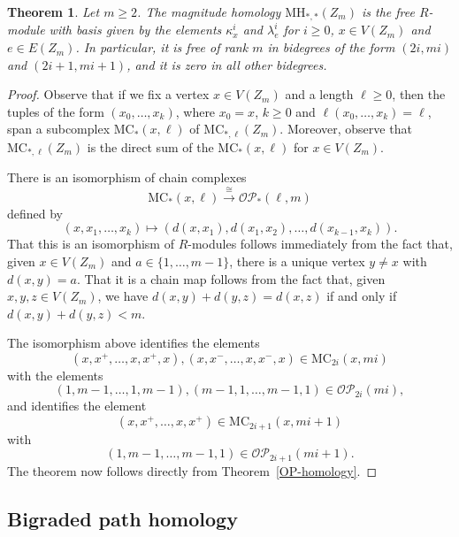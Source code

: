 \documentclass[a4paper, 11 pt, oneside, reqno]{amsart}
\numberwithin{lemma}{section}
\newtheorem{theorem}[lemma]{Theorem}
\theoremstyle{definition}
\newcommand{\OP}{\mathcal{OP}}
\newcommand{\MC}{\mathrm{MC}}
\newcommand{\MH}{\mathrm{MH}}
\begin{document}
\begin{theorem}\label{directed-cycle-MH}
    Let $m\geq 2$.
    The magnitude homology $\MH_{\ast,\ast}(Z_m)$
    is the free $R$-module with basis given by the 
    elements $\kappa_x^i$ and $\lambda_e^i$
    for $i\geq 0$, $x\in V(Z_m)$ and $e\in E(Z_m)$.
    In particular, it is free of rank
    $m$ in bidegrees of the form 
    $(2i,mi)$ and $(2i+1,mi+1)$, and it is zero
    in all other bidegrees.
\end{theorem}

\begin{proof}
    Observe that if we fix a vertex $x\in V(Z_m)$
    and a length $\ell\geq 0$,
    then the tuples of the form
    $(x_0,\ldots,x_k)$,
    where $x_0=x$, $k\geq 0$
    and $\ell(x_0,\ldots,x_k)=\ell$,
    span a subcomplex $\MC_\ast(x,\ell)$
    of $\MC_{\ast,\ell}(Z_m)$.
    Moreover, observe that 
    $\MC_{\ast,\ell}(Z_m)$ is the direct 
    sum of the $\MC_\ast(x,\ell)$ for $x\in V(Z_m)$.
    
    There is an isomorphism
    of chain complexes
    \[
        \MC_\ast(x,\ell)
        \xrightarrow{\ \cong\ }
        \OP_\ast(\ell,m)
    \]
    defined by
    \[
        (x,x_1,\ldots,x_k)
        \longmapsto
        (d(x,x_1),d(x_1,x_2),\ldots,d(x_{k-1},x_k)).
    \]
    That this is an isomorphism of $R$-modules follows
    immediately
    from the fact that, given $x\in V(Z_m)$ and
    $a\in\{1,\ldots,m-1\}$, there is a unique
    vertex $y\neq x$ with $d(x,y)=a$.
    That it is a chain map follows from the fact that,
    given $x,y,z\in V(Z_m)$,
    we have $d(x,y)+d(y,z)=d(x,z)$ if 
    and only if $d(x,y)+d(y,z)<m$.

    The isomorphism above identifies
    the elements 
    \[
        (x,x^+,\ldots,x,x^+,x),
        (x,x^-,\ldots,x,x^-,x)
        \in\MC_{2i}(x,mi)
    \]
    with the elements
    \[
        (1,m-1,\ldots,1,m-1),
        (m-1,1,\ldots,m-1,1)
        \in
        \OP_{2i}(mi),
    \]
    and identifies the element
    \[
        (x,x^+,\ldots,x,x^+)\in\MC_{2i+1}(x,mi+1)
    \]
    with
    \[
        (1,m-1,\ldots,m-1,1)\in\OP_{2i+1}(mi+1).
    \]
    The theorem now follows directly 
    from
    Theorem~\ref{OP-homology}.
\end{proof}



\subsection{Bigraded path homology}
\end{document}
